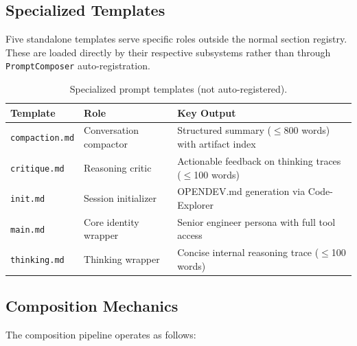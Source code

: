 \subsection{Specialized Templates}
\label{app:prompts_specialized}

Five standalone templates serve specific roles outside the normal section registry. These are loaded directly by their respective subsystems rather than through \texttt{PromptComposer} auto-registration.

\begin{table}[h]
\centering
\caption{Specialized prompt templates (not auto-registered).}
\label{tab:specialized_templates}
\footnotesize
\begin{tabular}{@{}llp{5.5cm}@{}}
\toprule
\textbf{Template} & \textbf{Role} & \textbf{Key Output} \\
\midrule
\texttt{compaction.md} & Conversation compactor & Structured summary ($\leq$800 words) with artifact index \\
\texttt{critique.md} & Reasoning critic & Actionable feedback on thinking traces ($\leq$100 words) \\
\texttt{init.md} & Session initializer & OPENDEV.md generation via Code-Explorer \\
\texttt{main.md} & Core identity wrapper & Senior engineer persona with full tool access \\
\texttt{thinking.md} & Thinking wrapper & Concise internal reasoning trace ($\leq$100 words) \\
\bottomrule
\end{tabular}
\end{table}

\subsection{Composition Mechanics}
\label{app:prompts_mechanics}

The composition pipeline operates as follows:

